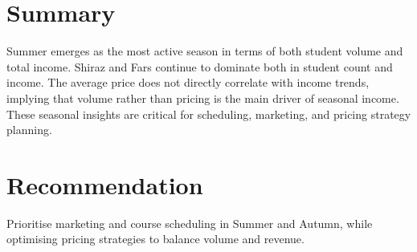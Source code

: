 \documentclass[12pt,a4paper]{article}
\begin{document}
\section*{Summary}
Summer emerges as the most active season in terms of both student volume and total income. Shiraz and Fars continue to dominate both in student count and income. The average price does not directly correlate with income trends, implying that volume rather than pricing is the main driver of seasonal income. These seasonal insights are critical for scheduling, marketing, and pricing strategy planning.

\section*{Recommendation}
Prioritise marketing and course scheduling in Summer and Autumn, while optimising pricing strategies to balance volume and revenue.
\end{document}
